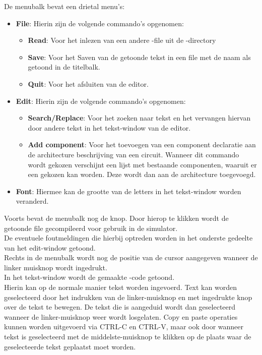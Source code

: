 De menubalk bevat een drietal menu's:
\begin{itemize}
\item {\bf File}: Hierin zijn de volgende commando's opgenomen:
            \begin{itemize}
            \item {\bf Read}: Voor het inlezen van een andere  -file uit de
             -directory
            \item {\bf Save}: Voor het Saven van de getoonde tekst in een file
              met de naam als getoond in de titelbalk.
            \item {\bf Quit}: Voor het afsluiten van de editor.
            \end{itemize}
\item {\bf Edit}: Hierin zijn de volgende commando's opgenomen:
            \begin{itemize}
            \item {\bf Search/Replace}: Voor het zoeken naar tekst en het
            vervangen hiervan door andere tekst in het tekst-window van de editor.
            \item {\bf Add component}: Voor het toevoegen van een component
            declaratie aan de architecture beschrijving van een circuit.
            Wanneer dit commando wordt gekozen verschijnt een lijst met
            bestaande componenten, waaruit er een gekozen kan worden.
            Deze wordt dan aan de architecture toegevoegd.
            \end{itemize}
\item {\bf Font}: Hiermee kan de grootte van de letters in het tekst-window worden
            veranderd.
\end{itemize}
Voorts bevat de menubalk nog de  knop. Door hierop te klikken
wordt de getoonde file gecompileerd voor gebruik in de simulator.\\
De eventuele foutmeldingen die hierbij optreden worden in het onderste
gedeelte van het edit-window getoond.\\
Rechts in de menubalk wordt nog de positie van de cursor aangegeven wanneer
de linker muisknop wordt ingedrukt.\\
In het tekst-window wordt de gemaakte -code getoond.\\
Hierin kan op de normale manier tekst worden ingevoerd.
Text kan worden geselecteerd door het indrukken van de linker-muisknop en met
ingedrukte knop over de tekst te bewegen. De tekst die is aangeduid wordt dan
geselecteerd wanneer de linker-muisknop weer wordt losgelaten.
Copy en paste operaties kunnen worden uitgevoerd via CTRL-C en CTRL-V, maar ook
door wanneer tekst is geselecteerd met de middelste-muisknop te klikken op de
plaats waar de geselecteerde tekst geplaatst moet worden.
\clearpage
